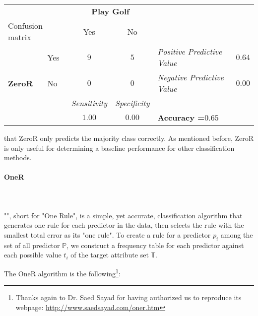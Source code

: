	\begin{table}[H]
		\centering
		\begin{tabular}{|l|l|c|c|l|l|}
		\hline
		\multicolumn{2}{|l|}{\cellcolor[HTML]{FFFFFF}} & \multicolumn{2}{c|}{\cellcolor[HTML]{C0C0C0}\textbf{Play Golf}} & \multicolumn{2}{l|}{} \\ \cline{3-4}
		\multicolumn{2}{|l|}{\multirow{-2}{*}{\cellcolor[HTML]{FFFFFF}Confusion matrix}} & \cellcolor[HTML]{C0C0C0}Yes & \cellcolor[HTML]{C0C0C0}No & \multicolumn{2}{l|}{\multirow{-2}{*}{}} \\ \hline
		\cellcolor[HTML]{C0C0C0} & \cellcolor[HTML]{C0C0C0}Yes & $9$ & $5$ & \cellcolor[HTML]{FFFFC7}\textit{Positive Predictive Value} & \cellcolor[HTML]{FFFFC7}$0.64$ \\ \cline{2-6} 
		\multirow{-2}{*}{\cellcolor[HTML]{C0C0C0}\textbf{ZeroR}} & \cellcolor[HTML]{C0C0C0}No & $0$ & $0$ & \cellcolor[HTML]{FFFFC7}\textit{Negative Predictive Value} & \cellcolor[HTML]{FFFFC7}$0.00$ \\ \hline
		\multicolumn{2}{|l|}{} & \cellcolor[HTML]{FFFFC7}\textit{Sensitivity} & \cellcolor[HTML]{FFFFC7}\textit{Specificity} & \multicolumn{2}{l|}{} \\ \cline{3-4}
		\multicolumn{2}{|l|}{\multirow{-2}{*}{}} & \cellcolor[HTML]{FFFFC7}$1.00$ & \cellcolor[HTML]{FFFFC7}$0.00$ & \multicolumn{2}{l|}{\multirow{-2}{*}{\textbf{Accuracy =}$0.65$}} \\ \hline
		\end{tabular}
	\end{table}
	that ZeroR only predicts the majority class correctly. As mentioned before, ZeroR is only useful for determining a baseline performance for other classification methods.
	
	\paragraph{OneR}\mbox{}\\\\
	"", short for "One Rule", is a simple, yet accurate, classification algorithm that generates one rule for each predictor in the data, then selects the rule with the smallest total error as its "one rule".  To create a rule for a predictor $p_i$ among the set of all predictor $\mathbb{P}$, we construct a frequency table for each predictor against each possible value $t_i$ of the target attribute set $\mathbb{T}$.
	
	The OneR algorithm is the following\footnote{Thanks again to Dr. Saed Sayad for having authorized us to reproduce its webpage: \url{http://www.saedsayad.com/oner.htm}}:

